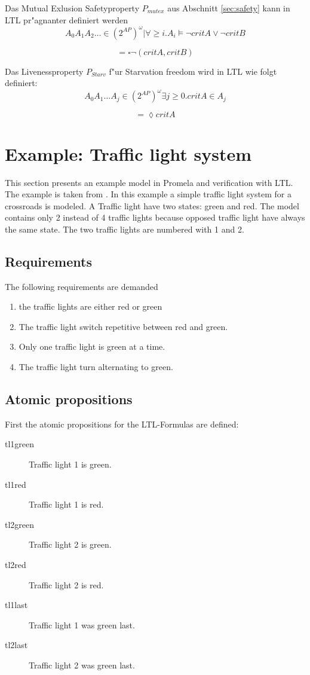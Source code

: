 \documentclass[a4paper, twoside]{article}
\begin{document}
Das Mutual Exlusion Safetyproperty $P_{mutex}$ aus Abschnitt \ref{sec:safety} kann in LTL pr"agnanter definiert werden
\[
  {A_0 A_1 A_2 \dots \in (2^{AP})^{\omega} | \forall \geq i.   A_i \models \neg critA \lor \neg critB}
\]

\[
= \square \neg (critA,critB)
\]

Das Livenessproperty $P_{Starv}$ f"ur Starvation freedom wird in LTL wie folgt definiert:
\[
 { A_0 A_1 \dots A_j \in (2^{AP})^{\omega} \exists j \geq 0. critA \in A_j}
\]

\[
= \lozenge critA
\]

\section{Example: Traffic light system}
\label{sec:example}

This section presents an example model in Promela and verification with LTL. The example is taken from \cite{kleuker09}. In this example a simple traffic light system for a crossroads is modeled. A Traffic light have two states: green and red. The model contains only 2 instead of 4 traffic lights because opposed traffic light have always the same state. The two traffic lights are numbered with 1 and 2.

\subsection{Requirements}
\label{sec:requirements}

The following requirements are demanded
\begin{enumerate}
\item the traffic lights are either red or green
\item The traffic light switch repetitive between red and green.
\item Only one traffic light is green at a time.
\item The traffic light turn alternating to green.
\end{enumerate}

\subsection{Atomic propositions}
\label{sec:trafficlightap}

First the atomic propositions for the LTL-Formulas are defined:

\begin{description}
\item[tl1green] Traffic light 1 is green.
\item[tl1red] Traffic light 1 is red.
\item[tl2green] Traffic light 2 is green.
\item[tl2red] Traffic light 2 is red.
\item[tl1last] Traffic light 1 was green last.
\item[tl2last] Traffic light 2 was green last.
\end{description}
\end{document}

